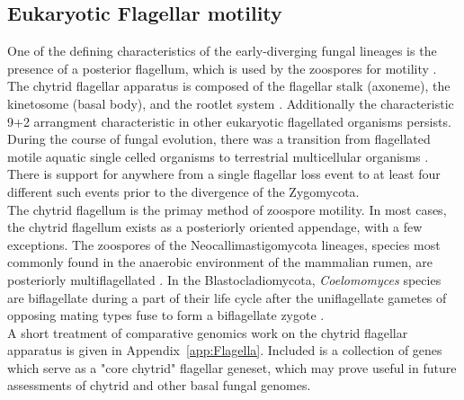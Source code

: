 \subsection{Eukaryotic Flagellar motility}
One of the defining characteristics of the early-diverging fungal lineages is the presence of a posterior flagellum, which is used by the zoospores for motility \cite{Koch1958}. The chytrid flagellar apparatus is composed of the flagellar stalk (axoneme), the kinetosome (basal body), and the rootlet system \cite{Barr1981}. Additionally the characteristic 9+2 arrangment characteristic in other eukaryotic flagellated organisms persists.\\
\indent During the course of fungal evolution, there was a transition from flagellated motile aquatic single celled organisms to terrestrial multicellular organisms \cite{Taylor2006}. There is support for anywhere from a single flagellar loss event \cite{Liu2006} to at least four different such events \cite{James2006sixGene} prior to the divergence of the Zygomycota.\\
\indent The chytrid flagellum is the primay method of zoospore motility. In most cases, the chytrid flagellum exists as a posteriorly oriented appendage, with a few exceptions. The zoospores of the Neocallimastigomycota lineages, species most commonly found in the anaerobic environment of the mammalian rumen, are posteriorly multiflagellated \cite{Ho1995}. In the Blastocladiomycota, \textit{Coelomomyces} species are biflagellate during a part of their life cycle after the uniflagellate gametes of opposing mating types fuse to form a biflagellate zygote \cite{Padua1986}.\\ 
\indent A short treatment of comparative genomics work on the chytrid flagellar apparatus is given in Appendix~\ref{app:Flagella}. Included is a collection of genes which serve as a "core chytrid" flagellar geneset, which may prove useful in future assessments of chytrid and other basal fungal genomes.\\
